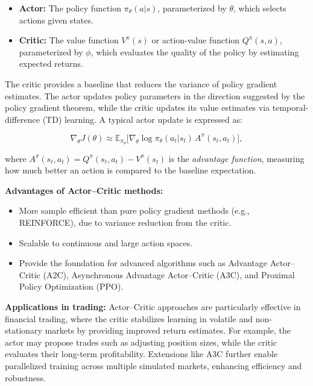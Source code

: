 \documentclass[12pt,a4paper]{report}
\begin{document}
\begin{itemize}
    \item \textbf{Actor:} The policy function $\pi_{\theta}(a|s)$, parameterized by $\theta$, which selects actions given states.
    \item \textbf{Critic:} The value function $V^{\pi}(s)$ or action-value function $Q^{\pi}(s,a)$, parameterized by $\phi$, which evaluates the quality of the policy by estimating expected returns.
\end{itemize}

The critic provides a baseline that reduces the variance of policy gradient estimates. The actor updates policy parameters in the direction suggested by the policy gradient theorem, while the critic updates its value estimates via temporal-difference (TD) learning. A typical actor update is expressed as:

\[
\nabla_\theta J(\theta) \approx \mathbb{E}_{\pi_\theta}\big[ \nabla_\theta \log \pi_\theta(a_t|s_t) \, A^{\pi}(s_t, a_t) \big],
\]

where $A^{\pi}(s_t, a_t) = Q^{\pi}(s_t, a_t) - V^{\pi}(s_t)$ is the \textit{advantage function}, measuring how much better an action is compared to the baseline expectation.

\bigskip

\textbf{Advantages of Actor–Critic methods:}
\begin{itemize}
    \item More sample efficient than pure policy gradient methods (e.g., REINFORCE), due to variance reduction from the critic.
    \item Scalable to continuous and large action spaces.
    \item Provide the foundation for advanced algorithms such as Advantage Actor–Critic (A2C), Asynchronous Advantage Actor–Critic (A3C), and Proximal Policy Optimization (PPO).
\end{itemize}

\bigskip

\textbf{Applications in trading:}  
Actor–Critic approaches are particularly effective in financial trading, where the critic stabilizes learning in volatile and non-stationary markets by providing improved return estimates. For example, the actor may propose trades such as adjusting position sizes, while the critic evaluates their long-term profitability. Extensions like A3C further enable parallelized training across multiple simulated markets, enhancing efficiency and robustness.
\end{document}
